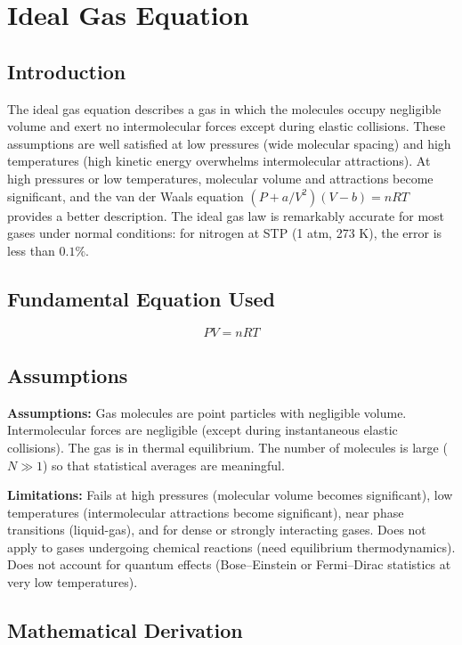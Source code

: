 \chapter{Ideal Gas Equation}

\section*{Introduction}

The ideal gas equation describes a gas in which the molecules occupy negligible volume and exert no intermolecular forces except during elastic collisions. These assumptions are well satisfied at low pressures (wide molecular spacing) and high temperatures (high kinetic energy overwhelms intermolecular attractions). At high pressures or low temperatures, molecular volume and attractions become significant, and the van der Waals equation $(P + a/V^2)(V - b) = nRT$ provides a better description. The ideal gas law is remarkably accurate for most gases under normal conditions: for nitrogen at STP (1 atm, 273 K), the error is less than $0.1\%$.
\section*{Fundamental Equation Used}

\[
PV=nRT
\]
\section*{Assumptions}

\textbf{Assumptions:} Gas molecules are point particles with negligible volume. Intermolecular forces are negligible (except during instantaneous elastic collisions). The gas is in thermal equilibrium. The number of molecules is large ($N \gg 1$) so that statistical averages are meaningful.


\textbf{Limitations:} Fails at high pressures (molecular volume becomes significant), low temperatures (intermolecular attractions become significant), near phase transitions (liquid-gas), and for dense or strongly interacting gases. Does not apply to gases undergoing chemical reactions (need equilibrium thermodynamics). Does not account for quantum effects (Bose--Einstein or Fermi--Dirac statistics at very low temperatures).


\section*{Mathematical Derivation}

